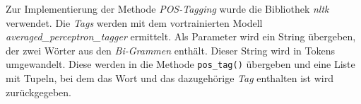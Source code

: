 Zur Implementierung der Methode \emph{POS-Tagging} wurde die Bibliothek \emph{nltk} verwendet. Die \emph{Tags} werden mit dem vortrainierten Modell \emph{averaged\_perceptron\_tagger} ermittelt.
Als Parameter wird ein String übergeben, der zwei Wörter aus den \emph{Bi-Grammen} enthält. Dieser String wird in Tokens umgewandelt. Diese werden in die Methode \lstinline{pos_tag()}
übergeben und eine Liste mit Tupeln, bei dem das Wort und das dazugehörige \emph{Tag} enthalten ist wird zurückgegeben.
